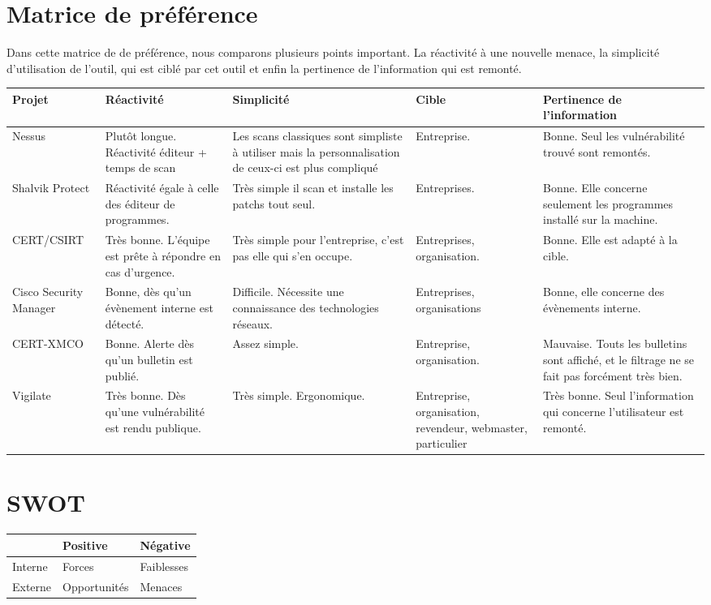 \section{Matrice de préférence}
\thispagestyle{plain}

Dans cette matrice de de préférence, nous comparons plusieurs points important. La réactivité à une nouvelle menace, la simplicité d’utilisation de l’outil, qui est ciblé par cet outil et enfin la pertinence de l’information qui est remonté.\\

\small
\begin{tabular}{|p{2.5cm}|p{3.5cm}|p{3.5cm}|p{2cm}|p{3.5cm}|}
  \hline
  \rowcolor{Gainsboro}Projet & Réactivité & Simplicité & Cible & Pertinence de l'information \\
\hline

  Nessus & Plutôt longue. Réactivité éditeur + temps de scan & Les scans classiques sont simpliste à utiliser mais la personnalisation de ceux-ci est plus compliqué & Entreprise. & Bonne. Seul les vulnérabilité trouvé sont remontés. \\
\hline

  Shalvik Protect & Réactivité égale à celle des éditeur de programmes. & Très simple il scan et installe les patchs tout seul. & Entreprises. & Bonne. Elle concerne seulement les programmes installé sur la machine. \\
\hline

  CERT/CSIRT & Très bonne. L’équipe est prête à répondre en cas d’urgence. & Très simple pour l’entreprise, c’est pas elle qui s’en occupe. & Entreprises, organisation. & Bonne. Elle est adapté à la cible.\\
\hline

  Cisco Security Manager & Bonne, dès qu’un évènement interne est détecté. & Difficile. Nécessite une connaissance des technologies réseaux. & Entreprises, organisations & Bonne, elle concerne des évènements interne.\\
\hline

  CERT-XMCO & Bonne. Alerte dès qu’un bulletin est publié. & Assez simple. & Entreprise, organisation. & Mauvaise. Touts les bulletins sont affiché, et le filtrage ne se fait pas forcément très bien. \\
\hline

  Vigilate & Très bonne. Dès qu’une vulnérabilité est rendu publique. & Très simple. Ergonomique. & Entreprise, organisation, revendeur, webmaster, particulier & Très bonne. Seul l’information qui concerne l’utilisateur est remonté. \\
\hline
\end{tabular}
\normalsize  


\section{SWOT}
\begin{tabular}{|l|p{5cm}|p{5cm}|}
  \hline
  \rowcolor{Gainsboro} & Positive & Négative \\
  \hline

  Interne & Forces & Faiblesses \\
  \hline

  Externe & Opportunités & Menaces \\
  \hline
\end{tabular}
